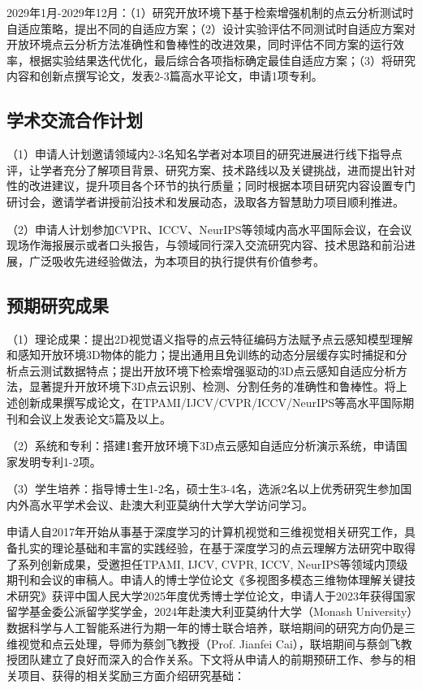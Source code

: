 \documentclass[12pt]{article}
\begin{document}
2029年1月-2029年12月：（1）研究开放环境下基于检索增强机制的点云分析测试时自适应策略，提出不同的自适应方案；（2）设计实验评估不同测试时自适应方案对开放环境点云分析方法准确性和鲁棒性的改进效果，同时评估不同方案的运行效率，根据实验结果迭代优化，最后综合各项指标确定最佳自适应方案；（3）将研究内容和创新点撰写论文，发表2-3篇高水平论文，申请1项专利。

\subsection{学术交流合作计划}

（1）申请人计划邀请领域内2-3名知名学者对本项目的研究进展进行线下指导点评，让学者充分了解项目背景、研究方案、技术路线以及关键挑战，进而提出针对性的改进建议，提升项目各个环节的执行质量；同时根据本项目研究内容设置专门研讨会，邀请学者讲授前沿技术和发展动态，汲取各方智慧助力项目顺利推进。

（2）申请人计划参加CVPR、ICCV、NeurIPS等领域内高水平国际会议，在会议现场作海报展示或者口头报告，与领域同行深入交流研究内容、技术思路和前沿进展，广泛吸收先进经验做法，为本项目的执行提供有价值参考。

\subsection{预期研究成果}

（1）理论成果：提出2D视觉语义指导的点云特征编码方法赋予点云感知模型理解和感知开放环境3D物体的能力；提出通用且免训练的动态分层缓存实时捕捉和分析点云测试数据特点；提出开放环境下检索增强驱动的3D点云感知自适应分析方法，显著提升开放环境下3D点云识别、检测、分割任务的准确性和鲁棒性。将上述创新成果撰写成论文，在TPAMI/IJCV/CVPR/ICCV/NeurIPS等高水平国际期刊和会议上发表论文5篇及以上。

（2）系统和专利：搭建1套开放环境下3D点云感知自适应分析演示系统，申请国家发明专利1-2项。

（3）学生培养：指导博士生1-2名，硕士生3-4名，选派2名以上优秀研究生参加国内外高水平学术会议、赴澳大利亚莫纳什大学大学访问学习。





申请人自2017年开始从事基于深度学习的计算机视觉和三维视觉相关研究工作，具备扎实的理论基础和丰富的实践经验，在基于深度学习的点云理解方法研究中取得了系列创新成果，受邀担任TPAMI, IJCV, CVPR, ICCV, NeurIPS等领域内顶级期刊和会议的审稿人。申请人的博士学位论文《多视图多模态三维物体理解关键技术研究》获评中国人民大学2025年度优秀博士学位论文，申请人于2023年获得国家留学基金委公派留学奖学金，2024年赴澳大利亚莫纳什大学（Monash University）数据科学与人工智能系进行为期一年的博士联合培养，联培期间的研究方向仍是三维视觉和点云处理，导师为蔡剑飞教授（Prof. Jianfei Cai），联培期间与蔡剑飞教授团队建立了良好而深入的合作关系。下文将从申请人的前期预研工作、参与的相关项目、获得的相关奖励三方面介绍研究基础：
\end{document}
